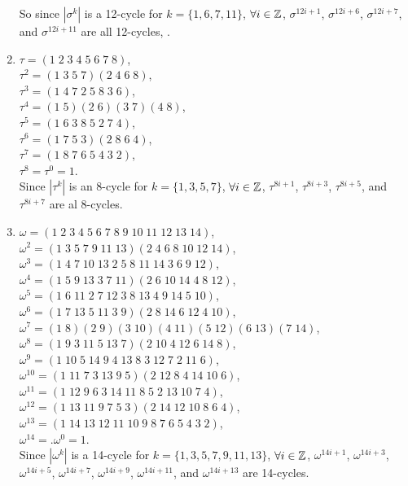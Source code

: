 \documentclass[12pt]{article}
\begin{document}
\begin{enumerate}[label=\textbf{\alph*.}]
            So since $|\sigma^k|$ is a 12-cycle for $k = \{ 1, 6, 7, 11 \}$,
            $\forall i \in \mathbb{Z}$, 
            $\sigma^{12i + 1}$, $\sigma^{12i + 6}$, $\sigma^{12i + 7}$, 
            and $\sigma^{12i + 11}$ are all 12-cycles, .
        \item 
            $\tau = (1\;2\;3\;4\;5\;6\;7\;8)$, \\
            $\tau^2 = (1\;3\;5\;7)(2\;4\;6\;8)$, \\
            $\tau^3 = (1\;4\;7\;2\;5\;8\;3\;6)$, \\
            $\tau^4 = (1\;5)(2\;6)(3\;7)(4\;8)$, \\
            $\tau^5 = (1\;6\;3\;8\;5\;2\;7\;4)$, \\
            $\tau^6 = (1\;7\;5\;3)(2\;8\;6\;4)$, \\
            $\tau^7 = (1\;8\;7\;6\;5\;4\;3\;2)$, \\
            $\tau^8 = \tau^0 = 1$. \\
            Since $|\tau^k|$ is an 8-cycle for $k = \{ 1, 3, 5, 7 \}$,
            $\forall i \in \mathbb{Z}$, 
            $\tau^{8i + 1}$, $\tau^{8i + 3}$, $\tau^{8i + 5}$, 
            and $\tau^{8i + 7}$ are al 8-cycles.
        \item
            $\omega = (1\;2\;3\;4\;5\;6\;7\;8\;9\;10\;11\;12\;13\;14)$, \\
            $\omega^2 = (1\;3\;5\;7\;9\;11\;13)(2\;4\;6\;8\;10\;12\;14)$, \\
            $\omega^3 = (1\;4\;7\;10\;13\;2\;5\;8\;11\;14\;3\;6\;9\;12)$, \\
            $\omega^4 = (1\;5\;9\;13\;3\;7\;11)(2\;6\;10\;14\;4\;8\;12)$, \\
            $\omega^5 = (1\;6\;11\;2\;7\;12\;3\;8\;13\;4\;9\;14\;5\;10)$, \\
            $\omega^6 = (1\;7\;13\;5\;11\;3\;9)(2\;8\;14\;6\;12\;4\;10)$, \\
            $\omega^7 = (1\;8)(2\;9)(3\;10)(4\;11)(5\;12)(6\;13)(7\;14)$, \\
            $\omega^8 = (1\;9\;3\;11\;5\;13\;7)(2\;10\;4\;12\;6\;14\;8)$, \\
            $\omega^9 = (1\;10\;5\;14\;9\;4\;13\;8\;3\;12\;7\;2\;11\;6)$, \\
            $\omega^{10} = (1\;11\;7\;3\;13\;9\;5)(2\;12\;8\;4\;14\;10\;6)$, \\
            $\omega^{11} = (1\;12\;9\;6\;3\;14\;11\;8\;5\;2\;13\;10\;7\;4)$, \\
            $\omega^{12} = (1\;13\;11\;9\;7\;5\;3)(2\;14\;12\;10\;8\;6\;4)$, \\
            $\omega^{13} = (1\;14\;13\;12\;11\;10\;9\;8\;7\;6\;5\;4\;3\;2)$, \\
            $\omega^{14} = .\omega^0 = 1$. \\
            Since $|\omega^k|$ is a 14-cycle for
            $k = \{ 1, 3, 5, 7, 9, 11, 13 \}$, $\forall i \in \mathbb{Z}$, 
            $\omega^{14i + 1}$, $\omega^{14i + 3}$, $\omega^{14i + 5}$,
            $\omega^{14i + 7}$, $\omega^{14i + 9}$, $\omega^{14i + 11}$,
            and $\omega^{14i + 13}$ are 14-cycles.
    \end{enumerate}
\end{document}
